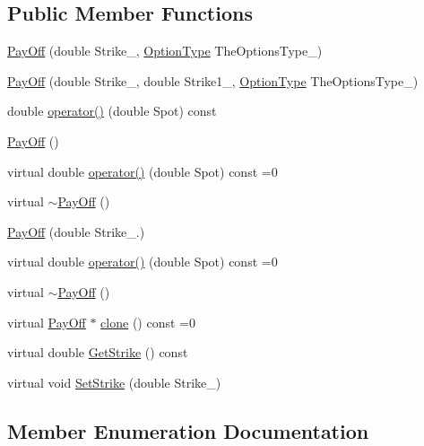 \subsection*{Public Member Functions}
\begin{DoxyCompactItemize}
\item 
\hyperlink{classPayOff_a5c8db63f8e94e514b7e0963beb8a852a}{Pay\+Off} (double Strike\+\_\+, \hyperlink{classPayOff_a57262243a4bf56ddf5b78d7f563440c8}{Option\+Type} The\+Options\+Type\+\_\+)
\item 
\hyperlink{classPayOff_a185b279eeea3e2d52f5acb225eaf8d64}{Pay\+Off} (double Strike\+\_\+, double Strike1\+\_\+, \hyperlink{classPayOff_a57262243a4bf56ddf5b78d7f563440c8}{Option\+Type} The\+Options\+Type\+\_\+)
\item 
double \hyperlink{classPayOff_a0f08e9967d3ae5d9b41005451cefd76d}{operator()} (double Spot) const
\item 
\hyperlink{classPayOff_ade8032093538388f53c706bda715f39f}{Pay\+Off} ()
\item 
virtual double \hyperlink{classPayOff_a5ae17d82c233ef5568c8fb0539703000}{operator()} (double Spot) const =0
\item 
virtual \hyperlink{classPayOff_ad7aa3a49e4a7e9cab7dc283d69a3f1ff}{$\sim$\+Pay\+Off} ()
\item 
\hyperlink{classPayOff_a811923da1ef0f1c6a49076791c453886}{Pay\+Off} (double Strike\+\_.)
\item 
virtual double \hyperlink{classPayOff_a5ae17d82c233ef5568c8fb0539703000}{operator()} (double Spot) const =0
\item 
virtual \hyperlink{classPayOff_ad7aa3a49e4a7e9cab7dc283d69a3f1ff}{$\sim$\+Pay\+Off} ()
\item 
virtual \hyperlink{classPayOff}{Pay\+Off} $\ast$ \hyperlink{classPayOff_ad8194d5b82247ae89c25c515f0ba806a}{clone} () const =0
\item 
virtual double \hyperlink{classPayOff_aa7a2451e286496c8d5a153000a818d34}{Get\+Strike} () const
\item 
virtual void \hyperlink{classPayOff_a3fdefed95df90a057acfd697f5703e04}{Set\+Strike} (double Strike\+\_\+)
\end{DoxyCompactItemize}


\subsection{Member Enumeration Documentation}
\hypertarget{classPayOff_a57262243a4bf56ddf5b78d7f563440c8}{}\label{classPayOff_a57262243a4bf56ddf5b78d7f563440c8} 
